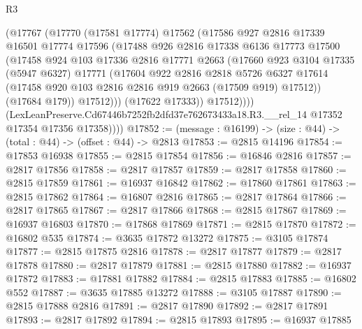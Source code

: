 \begin{lexlean}{R3}
\begin{coremodule}
                (@17767
                  (@17770
                    (@17581 @17774)
                    @17562
                    (@17586
                      @927
                      @2816
                      @17339
                      @16501
                      @17774
                      @17596
                      (@17488
                        @926
                        @2816
                        @17338
                        @6136
                        @17773
                        @17500
                        (@17458
                          @924
                          @103
                          @17336
                          @2816
                          @17771
                          @2663
                          (@17660
                            @923
                            @3104
                            @17335
                            (@5947 @6327)
                            @17771
                            (@17604
                              @922
                              @2816
                              @2818
                              @5726
                              @6327
                              @17614
                              (@17458 @920 @103 @2816 @2816 @919 @2663 (@17509 @919) @17512))
                            (@17684 @179))
                          @17512)))
                    (@17622 @17333))
                  @17512))))
          (LexLeanPreserve.Cd67446b7252fb2dfd37e762673433a18.R3.__rel_14
            @17352
            @17354
            @17356
            @17358))))
@17852 := (message : @16199) -> (size : @44) -> (total : @44) -> (offset : @44) -> @2813
@17853 := @2815 @14196
@17854 := @17853 @16938
@17855 := @2815 @17854
@17856 := @16846 @2816
@17857 := @2817 @17856
@17858 := @2817 @17857
@17859 := @2817 @17858
@17860 := @2815 @17859
@17861 := @16937 @16842
@17862 := @17860 @17861
@17863 := @2815 @17862
@17864 := @16807 @2816
@17865 := @2817 @17864
@17866 := @2817 @17865
@17867 := @2817 @17866
@17868 := @2815 @17867
@17869 := @16937 @16803
@17870 := @17868 @17869
@17871 := @2815 @17870
@17872 := @16802 @535
@17874 := @3635 @17872 @13272
@17875 := @3105 @17874
@17877 := @2815 @17875 @2816
@17878 := @2817 @17877
@17879 := @2817 @17878
@17880 := @2817 @17879
@17881 := @2815 @17880
@17882 := @16937 @17872
@17883 := @17881 @17882
@17884 := @2815 @17883
@17885 := @16802 @552
@17887 := @3635 @17885 @13272
@17888 := @3105 @17887
@17890 := @2815 @17888 @2816
@17891 := @2817 @17890
@17892 := @2817 @17891
@17893 := @2817 @17892
@17894 := @2815 @17893
@17895 := @16937 @17885

\end{coremodule}
\end{lexlean}
